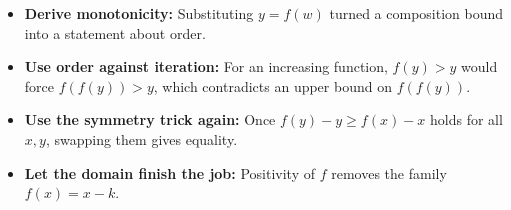\begin{takeaways}
\begin{itemize}
\item \textbf{Derive monotonicity:} Substituting \(y=f(w)\) turned a composition bound into a statement about order.
\item \textbf{Use order against iteration:} For an increasing function, \(f(y)>y\) would force \(f(f(y))>y\), which contradicts an upper bound on \(f(f(y))\).
\item \textbf{Use the symmetry trick again:} Once \(f(y)-y\ge f(x)-x\) holds for all \(x,y\), swapping them gives equality.
\item \textbf{Let the domain finish the job:} Positivity of \(f\) removes the family \(f(x)=x-k\).
\end{itemize}
\end{takeaways}
